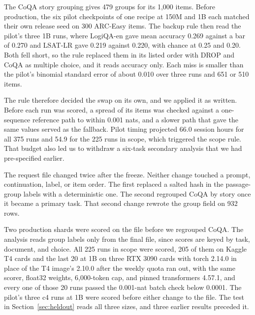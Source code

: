 The CoQA story grouping gives 479 groups for its 1,000 items. Before production, the six pilot checkpoints of one recipe at 150M and 1B each matched their own release seed on 300 ARC-Easy items. The backup rule then read the pilot's three 1B runs, where LogiQA-en gave mean accuracy 0.269 against a bar of 0.270 and LSAT-LR gave 0.219 against 0.220, with chance at 0.25 and 0.20. Both fell short, so the rule replaced them in its listed order with DROP and CoQA as multiple choice, and it reads accuracy only. Each miss is smaller than the pilot's binomial standard error of about 0.010 over three runs and 651 or 510 items.

The rule therefore decided the swap on its own, and we applied it as written. Before each run was scored, a spread of its items was checked against a one-sequence reference path to within 0.001 nats, and a slower path that gave the same values served as the fallback. Pilot timing projected 66.0 session hours for all 375 runs and 54.9 for the 225 runs in scope, which triggered the scope rule. That budget also led us to withdraw a six-task secondary analysis that we had pre-specified earlier.

The request file changed twice after the freeze. Neither change touched a prompt, continuation, label, or item order. The first replaced a salted hash in the passage-group labels with a deterministic one. The second regrouped CoQA by story once it became a primary task. That second change rewrote the group field on 932 rows.

Two production shards were scored on the file before we regrouped CoQA. The analysis reads group labels only from the final file, since scores are keyed by task, document, and choice. All 225 runs in scope were scored, 205 of them on Kaggle T4 cards and the last 20 at 1B on three RTX 3090 cards with torch 2.14.0 in place of the T4 image's 2.10.0 after the weekly quota ran out, with the same scorer, float32 weights, 6,000-token cap, and pinned transformers 4.57.1, and every one of those 20 runs passed the 0.001-nat batch check below 0.0001. The pilot's three c4 runs at 1B were scored before either change to the file. The test in Section~\ref{sec:heldout} reads all three sizes, and three earlier results preceded it.

